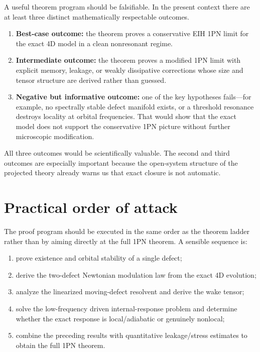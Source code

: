 \documentclass[11pt]{article}
\begin{document}
A useful theorem program should be falsifiable. In the present context there are at least three distinct mathematically respectable outcomes.
\begin{enumerate}[leftmargin=1.5em]
  \item \textbf{Best-case outcome:} the theorem proves a conservative EIH 1PN limit for the exact 4D model in a clean nonresonant regime.
  \item \textbf{Intermediate outcome:} the theorem proves a modified 1PN limit with explicit memory, leakage, or weakly dissipative corrections whose size and tensor structure are derived rather than guessed.
  \item \textbf{Negative but informative outcome:} one of the key hypotheses fails---for example, no spectrally stable defect manifold exists, or a threshold resonance destroys locality at orbital frequencies. That would show that the exact model does not support the conservative 1PN picture without further microscopic modification.
\end{enumerate}

All three outcomes would be scientifically valuable. The second and third outcomes are especially important because the open-system structure of the projected theory already warns us that exact closure is not automatic.

\section{Practical order of attack}
\label{sec:order}

The proof program should be executed in the same order as the theorem ladder rather than by aiming directly at the full 1PN theorem. A sensible sequence is:
\begin{enumerate}[leftmargin=1.5em]
  \item prove existence and orbital stability of a single defect;
  \item derive the two-defect Newtonian modulation law from the exact 4D evolution;
  \item analyze the linearized moving-defect resolvent and derive the wake tensor;
  \item solve the low-frequency driven internal-response problem and determine whether the exact response is local/adiabatic or genuinely nonlocal;
  \item combine the preceding results with quantitative leakage/stress estimates to obtain the full 1PN theorem.
\end{enumerate}
\end{document}
